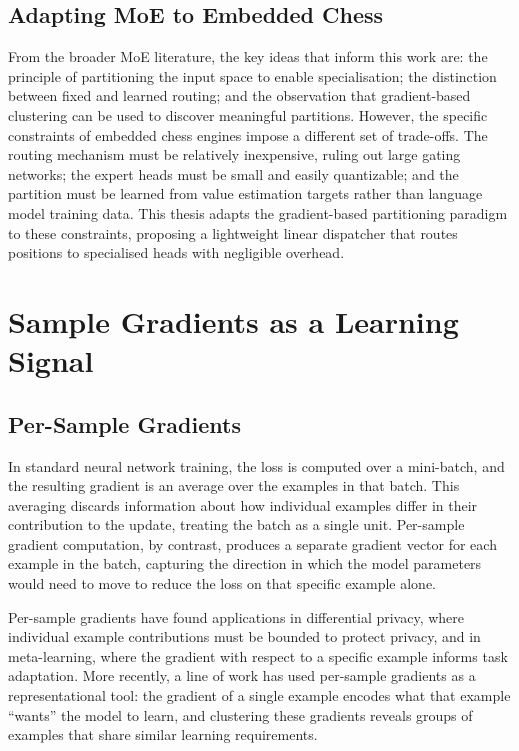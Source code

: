 \subsection{Adapting MoE to Embedded Chess}
From the broader MoE literature, the key ideas that inform this work are: the principle of partitioning the input space to enable specialisation; the distinction between fixed and learned routing; and the observation that gradient-based clustering can be used to discover meaningful partitions. However, the specific constraints of embedded chess engines impose a different set of trade-offs. The routing mechanism must be relatively inexpensive, ruling out large gating networks; the expert heads must be small and easily quantizable; and the partition must be learned from value estimation targets rather than language model training data. This thesis adapts the gradient-based partitioning paradigm to these constraints, proposing a lightweight linear dispatcher that routes positions to specialised heads with negligible overhead.

\section{Sample Gradients as a Learning Signal}

\subsection{Per-Sample Gradients}
In standard neural network training, the loss is computed over a mini-batch, and the resulting gradient is an average over the examples in that batch. This averaging discards information about how individual examples differ in their contribution to the update, treating the batch as a single unit. Per-sample gradient computation, by contrast, produces a separate gradient vector for each example in the batch, capturing the direction in which the model parameters would need to move to reduce the loss on that specific example alone.

Per-sample gradients have found applications in differential privacy, where individual example contributions must be bounded to protect privacy, and in meta-learning, where the gradient with respect to a specific example informs task adaptation. More recently, a line of work has used per-sample gradients as a representational tool: the gradient of a single example encodes what that example ``wants'' the model to learn, and clustering these gradients reveals groups of examples that share similar learning requirements.

